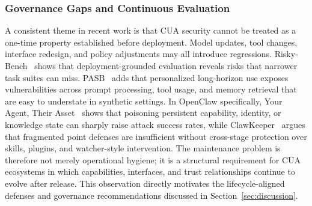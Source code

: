 \subsubsection{Governance Gaps and Continuous Evaluation}

A consistent theme in recent work is that CUA security cannot be treated as a one-time property established before deployment. Model updates, tool changes, interface redesign, and policy adjustments may all introduce regressions. Risky-Bench~\cite{zheng2026riskybench} shows that deployment-grounded evaluation reveals risks that narrower task suites can miss. PASB~\cite{wang2026pasb} adds that personalized long-horizon use exposes vulnerabilities across prompt processing, tool usage, and memory retrieval that are easy to understate in synthetic settings. In OpenClaw specifically, Your Agent, Their Asset~\cite{wang2026asset} shows that poisoning persistent capability, identity, or knowledge state can sharply raise attack success rates, while ClawKeeper~\cite{liu2026clawkeeper} argues that fragmented point defenses are insufficient without cross-stage protection over skills, plugins, and watcher-style intervention. The maintenance problem is therefore not merely operational hygiene; it is a structural requirement for CUA ecosystems in which capabilities, interfaces, and trust relationships continue to evolve after release. This observation directly motivates the lifecycle-aligned defenses and governance recommendations discussed in Section~\ref{sec:discussion}.
